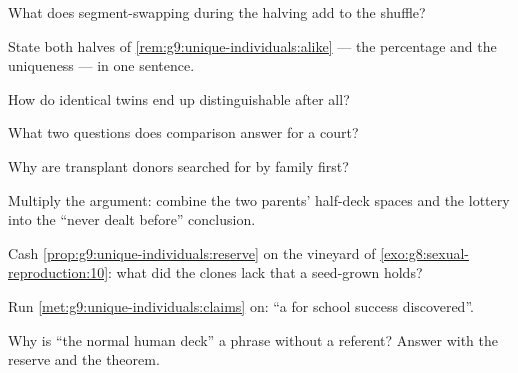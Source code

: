 \begin{exercise}[$\star$]\label{exo:g9:unique-individuals:2}
What does segment-swapping during the halving add to the
shuffle?
\end{exercise}

\begin{exercise}[$\star$]\label{exo:g9:unique-individuals:3}
State both halves of \cref{rem:g9:unique-individuals:alike}
--- the percentage and the uniqueness --- in one
sentence.
\end{exercise}

\begin{exercise}[$\star$]\label{exo:g9:unique-individuals:4}
How do identical twins end up distinguishable after all?
\end{exercise}

\begin{exercise}[$\star$]\label{exo:g9:unique-individuals:5}
What two questions does  comparison answer for a
court?
\end{exercise}

\begin{exercise}[$\star$]\label{exo:g9:unique-individuals:6}
Why are transplant donors searched for by family first?
\end{exercise}

\begin{exercise}[$\star\star$]\label{exo:g9:unique-individuals:7}
Multiply the argument: combine the two parents'
half-deck spaces and the  lottery into the
``never dealt before'' conclusion.
\end{exercise}

\begin{exercise}[$\star\star$]\label{exo:g9:unique-individuals:8}
Cash \cref{prop:g9:unique-individuals:reserve} on the
vineyard of \cref{exo:g8:sexual-reproduction:10}: what
did the clones lack that a seed-grown  holds?
\end{exercise}

\begin{exercise}[$\star\star$]\label{exo:g9:unique-individuals:9}
Run \cref{met:g9:unique-individuals:claims} on: ``a 
for school success discovered''.
\end{exercise}

\begin{exercise}[$\star\star$]\label{exo:g9:unique-individuals:10}
Why is ``the normal human deck'' a phrase without a
referent? Answer with the reserve and the theorem.
\end{exercise}

